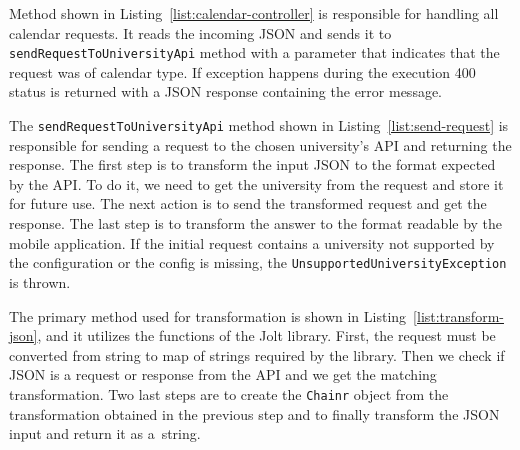 Method shown in Listing~\ref{list:calendar-controller} is responsible for handling all calendar requests. It reads the incoming JSON and sends it to \texttt{sendRequestToUniversityApi} method with a parameter that indicates that the request was of calendar type. If exception happens during the execution 400 status is returned with a JSON response containing the error message.



The \texttt{sendRequestToUniversityApi} method shown in Listing~\ref{list:send-request} is responsible for sending a request to the chosen university's API and returning the response. The first step is to transform the input JSON to the format expected by the API. To do it, we need to get the university from the request and store it for future use. The next action is to send the transformed request and get the response. The last step is to transform the answer to the format readable by the mobile application. If the initial request contains a university not supported by the configuration or the config is missing, the \texttt{UnsupportedUniversityException} is thrown.



The primary method used for transformation is shown in Listing~\ref{list:transform-json}, and it utilizes the functions of the Jolt library. First, the request must be converted from string to map of strings required by the library. Then we check if JSON is a request or response from the API and we get the matching transformation. Two last steps are to create the \texttt{Chainr} object from the transformation obtained in the previous step and to finally transform the JSON input and return it as a~string.


